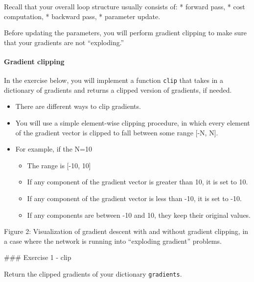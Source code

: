 \documentclass[11pt]{article}
\providecommand{\tightlist}{%
      \setlength{\itemsep}{0pt}\setlength{\parskip}{0pt}}
\begin{document}
Recall that your overall loop structure usually consists of: * forward
pass, * cost computation, * backward pass, * parameter update.

Before updating the parameters, you will perform gradient clipping to
make sure that your gradients are not ``exploding.''

\hypertarget{gradient-clipping}{%
\paragraph{Gradient clipping}\label{gradient-clipping}}

In the exercise below, you will implement a function \texttt{clip} that
takes in a dictionary of gradients and returns a clipped version of
gradients, if needed.

\begin{itemize}
\tightlist
\item
  There are different ways to clip gradients.
\item
  You will use a simple element-wise clipping procedure, in which every
  element of the gradient vector is clipped to fall between some range
  {[}-N, N{]}.
\item
  For example, if the N=10

  \begin{itemize}
  \tightlist
  \item
    The range is {[}-10, 10{]}
  \item
    If any component of the gradient vector is greater than 10, it is
    set to 10.
  \item
    If any component of the gradient vector is less than -10, it is set
    to -10.
  \item
    If any components are between -10 and 10, they keep their original
    values.
  \end{itemize}
\end{itemize}

Figure 2: Visualization of gradient descent with and without gradient
clipping, in a case where the network is running into ``exploding
gradient'' problems.

\#\#\# Exercise 1 - clip

Return the clipped gradients of your dictionary \texttt{gradients}.
\end{document}
